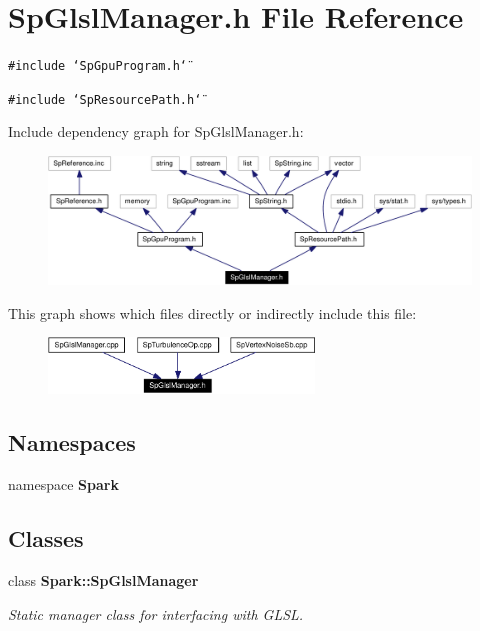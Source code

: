 \section{Sp\-Glsl\-Manager.h File Reference}
\label{SpGlslManager_8h}
{\tt \#include \char`\"{}Sp\-Gpu\-Program.h\char`\"{}}\par
{\tt \#include \char`\"{}Sp\-Resource\-Path.h\char`\"{}}\par


Include dependency graph for Sp\-Glsl\-Manager.h:\begin{figure}[H]
\begin{center}
\leavevmode
\includegraphics[width=329pt]{SpGlslManager_8h__incl}
\end{center}
\end{figure}


This graph shows which files directly or indirectly include this file:\begin{figure}[H]
\begin{center}
\leavevmode
\includegraphics[width=200pt]{SpGlslManager_8h__dep__incl}
\end{center}
\end{figure}
\subsection*{Namespaces}
\begin{CompactItemize}
\item 
namespace {\bf Spark}
\end{CompactItemize}
\subsection*{Classes}
\begin{CompactItemize}
\item 
class {\bf Spark::Sp\-Glsl\-Manager}
\begin{CompactList}\small\item\em Static manager class for interfacing with GLSL. \item\end{CompactList}\end{CompactItemize}
